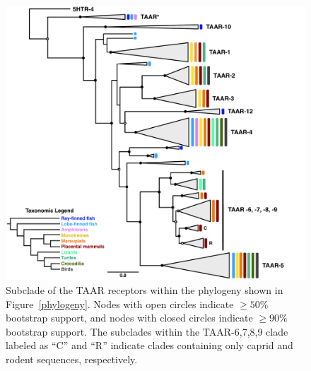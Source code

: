 \documentclass[fleqn,10pt]{wlpeerj}
\begin{document}
\begin{figure}[htbp]
	\centerline{\includegraphics[width=15cm]{figures/taar_taxonomy.pdf}}
	\caption{\label{taar_tree} Subclade of the TAAR receptors within the phylogeny shown in Figure~\ref{phylogeny}. Nodes with open circles indicate $\geq 50\%$ bootstrap support, and nodes with closed circles indicate $\geq 90\%$ bootstrap support. The subclades within the TAAR-6,7,8,9 clade labeled as ``C'' and ``R'' indicate clades containing only caprid and rodent sequences, respectively.}
\end{figure}
\end{document}
